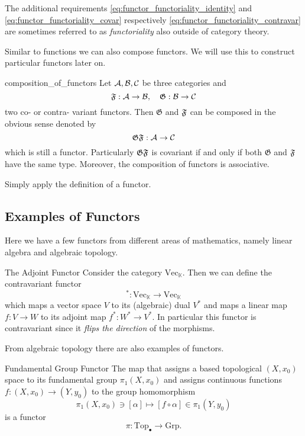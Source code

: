 The additional requirements \eqref{eq:functor_functoriality_identity} and \eqref{eq:functor_functoriality_covar} respectively \eqref{eq:functor_functoriality_contravar} are sometimes referred to as \emph{functoriality} also outside of category theory.

Similar to functions we can also compose functors. We will use this to construct particular functors later on.

\begin{defprop}{\cite[Section~1.3.1]{Roman2017}}{composition_of_functors}
Let $\mathcal{A}, \mathcal{B}, \mathcal{C}$ be three categories and
$$
\mathfrak{F}: \mathcal{A} \to \mathcal{B}, \quad \mathfrak{G}: \mathcal{B} \to \mathcal{C}
$$
two co- or contra- variant functors. Then $\mathfrak{G}$ and $\mathfrak{F}$ can be composed in the obvious sense denoted by
$$\mathfrak{G} \mathfrak{F}: \mathcal{A} \to \mathcal{C}$$
which is still a functor. Particularly $\mathfrak{G} \mathfrak{F}$ is covariant if and only if both $\mathfrak{G}$ and $\mathfrak{F}$ have the same type. Moreover, the composition of functors is associative.
\end{defprop}
\begin{proofidea}
Simply apply the definition of a functor.
\end{proofidea}

\subsection{Examples of Functors}

Here we have a few functors from different areas of mathematics, namely linear algebra and algebraic topology.

\begin{example}{The Adjoint Functor \cite[Ex.~1.2.12]{Leinster2014-dc}}{}
Consider the category $\mathrm{Vec}_\mathbb{K}$. Then we can define the contravariant functor
$$
^* : \mathrm{Vec}_\mathbb{K} \to \mathrm{Vec}_\mathbb{K}
$$
which maps a vector space $V$ to its (algebraic) dual $V^*$ and maps a linear map $f: V \to W$ to its adjoint map $f^*: W^* \to V^*$. In particular this functor is contravariant since it \emph{flips the direction} of the morphisms.
\end{example}

From algebraic topology there are also examples of functors.
\begin{example}{Fundamental Group Functor \cite[Ex.~1.2.5]{Leinster2014-dc}}{}
The map that assigns a based topological $(X,x_0)$ space to its fundamental group $\pi_1(X,x_0)$ and assigns continuous functions $f: (X,x_0) \to (Y,y_0)$ to the group homomorphism 
$$
\pi_1(X,x_0) \ni [\alpha] \mapsto [f \circ \alpha] \in \pi_1(Y,y_0)
$$
is a functor
$$
\pi: \mathrm{Top}_\bullet \to \mathrm{Grp}.
$$
\end{example}


